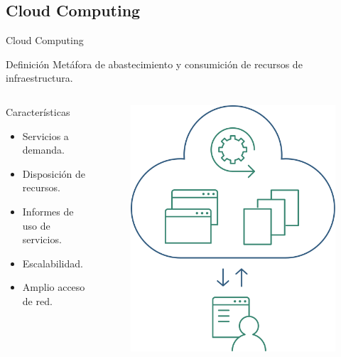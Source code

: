 \documentclass[10pt,xcolor=table ]{beamer}
\begin{document}
\subsection{Cloud Computing}
\begin{frame}{Cloud Computing}
	\begin{alertblock}{Definición}
		Metáfora de abastecimiento y consumición de recursos de infraestructura.
	\end{alertblock}

	\begin{columns}[c,onlytextwidth]
		\begin{block}{Características}
			\begin{itemize}
	        	\item Servicios a demanda.
	        	\item Disposición de recursos.
	        	\item Informes de uso de servicios.
	        	\item Escalabilidad.
	      		\item Amplio acceso de red.
	    	\end{itemize}
		\end{block}
		\begin{figure}[H]
			\includegraphics[scale=0.23]{../Figuras/cloud_computing}
		\end{figure}
  	\end{columns}
\end{frame}
\end{document}
